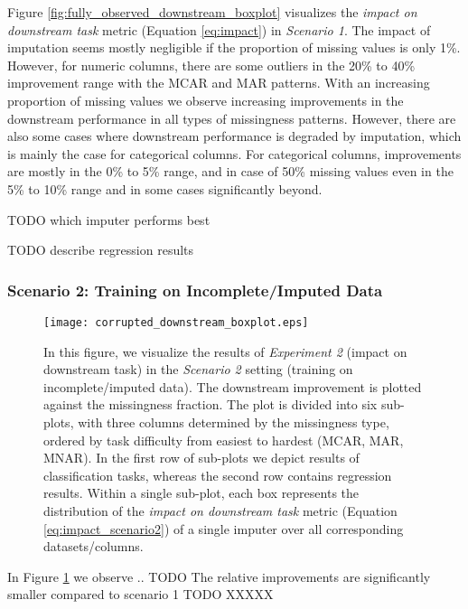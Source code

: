Figure \ref{fig:fully_observed_downstream_boxplot} visualizes the \textit{impact on downstream task} metric (Equation \ref{eq:impact}) in \textit{Scenario 1}. The impact of imputation seems mostly negligible if the proportion of missing values is only 1\%. However, for numeric columns, there are some outliers in the 20\% to 40\% improvement range with the MCAR and MAR patterns. With an increasing proportion of missing values we observe increasing improvements in the downstream performance in all types of missingness patterns. However, there are also some cases where downstream performance is degraded by imputation, which is mainly the case for categorical columns. For categorical columns, improvements are mostly in the 0\% to 5\% range, and in case of 50\% missing values even in the 5\% to 10\% range and in some cases significantly beyond.

TODO which imputer performs best

TODO describe regression results


\subsubsection{Scenario 2: Training on Incomplete/Imputed Data}


\begin{figure}\centering
	\texttt{[image: corrupted\_downstream\_boxplot.eps]}

	\caption[Downstream Ranks - Corrupted]{In this figure, we visualize the results of \textit{Experiment 2} (impact on downstream task) in the \textit{Scenario 2} setting (training on incomplete/imputed data). The downstream improvement is plotted against the missingness fraction. The plot is divided into six sub-plots, with three columns determined by the missingness type, ordered by task difficulty from easiest to hardest (MCAR, MAR, MNAR). In the first row of sub-plots we depict results of classification tasks, whereas the second row contains regression results. Within a single sub-plot, each box represents the distribution of the \textit{impact on downstream task} metric (Equation \ref{eq:impact_scenario2}) of a single imputer over all corresponding datasets/columns.
    }
	\label{fig:corrupted_downstream_boxplot}
\end{figure}

In Figure \ref{fig:corrupted_downstream_boxplot} we observe .. TODO
The relative improvements are significantly smaller compared to scenario 1
TODO XXXXX




